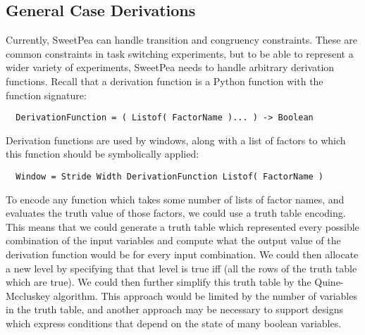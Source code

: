 \subsection{General Case Derivations}

Currently, SweetPea can handle transition and congruency constraints. These are common constraints in task switching experiments, but to be able to represent a wider variety of experiments, SweetPea needs to handle arbitrary derivation functions. Recall that a derivation function is a Python function with the function signature:

\begin{verbatim}
  DerivationFunction = ( Listof( FactorName )... ) -> Boolean
\end{verbatim}

Derivation functions are used by windows, along with a list of factors to which this function should be symbolically applied:

\begin{verbatim}
  Window = Stride Width DerivationFunction Listof( FactorName )
\end{verbatim}

To encode any function which takes some number of lists of factor names, and evaluates the truth value of those factors, we could use a truth table encoding. This means that we could generate a truth table which represented every possible combination of the input variables and compute what the output value of the derivation function would be for every input combination. We could then allocate a new level by specifying that that level is true iff (all the rows of the truth table which are true). We could then further simplify this truth table by the Quine-Mccluskey algorithm. This approach would be limited by the number of variables in the truth table, and another approach may be necessary to support designs which express conditions that depend on the state of many boolean variables.

%
%
%

